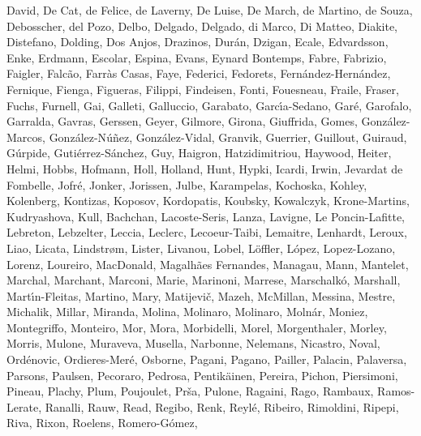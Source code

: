 \documentclass{aa}
\begin{document}
\begin{thebibliography}{242}
{  {David}, {De Cat}, {de Felice}, {de Laverny}, {De Luise}, {De March}, {de
  Martino}, {de Souza}, {Debosscher}, {del Pozo}, {Delbo}, {Delgado},
  {Delgado}, {di Marco}, {Di Matteo}, {Diakite}, {Distefano}, {Dolding}, {Dos
  Anjos}, {Drazinos}, {Dur{\'a}n}, {Dzigan}, {Ecale}, {Edvardsson}, {Enke},
  {Erdmann}, {Escolar}, {Espina}, {Evans}, {Eynard Bontemps}, {Fabre},
  {Fabrizio}, {Faigler}, {Falc{\~a}o}, {Farr{\`a}s Casas}, {Faye}, {Federici},
  {Fedorets}, {Fern{\'a}ndez-Hern{\'a}ndez}, {Fernique}, {Fienga}, {Figueras},
  {Filippi}, {Findeisen}, {Fonti}, {Fouesneau}, {Fraile}, {Fraser}, {Fuchs},
  {Furnell}, {Gai}, {Galleti}, {Galluccio}, {Garabato}, {Garc{\'{\i}}a-Sedano},
  {Gar{\'e}}, {Garofalo}, {Garralda}, {Gavras}, {Gerssen}, {Geyer}, {Gilmore},
  {Girona}, {Giuffrida}, {Gomes}, {Gonz{\'a}lez-Marcos},
  {Gonz{\'a}lez-N{\'u}{\~n}ez}, {Gonz{\'a}lez-Vidal}, {Granvik}, {Guerrier},
  {Guillout}, {Guiraud}, {G{\'u}rpide}, {Guti{\'e}rrez-S{\'a}nchez}, {Guy},
  {Haigron}, {Hatzidimitriou}, {Haywood}, {Heiter}, {Helmi}, {Hobbs},
  {Hofmann}, {Holl}, {Holland}, {Hunt}, {Hypki}, {Icardi}, {Irwin}, {Jevardat
  de Fombelle}, {Jofr{\'e}}, {Jonker}, {Jorissen}, {Julbe}, {Karampelas},
  {Kochoska}, {Kohley}, {Kolenberg}, {Kontizas}, {Koposov}, {Kordopatis},
  {Koubsky}, {Kowalczyk}, {Krone-Martins}, {Kudryashova}, {Kull}, {Bachchan},
  {Lacoste-Seris}, {Lanza}, {Lavigne}, {Le Poncin-Lafitte}, {Lebreton},
  {Lebzelter}, {Leccia}, {Leclerc}, {Lecoeur-Taibi}, {Lemaitre}, {Lenhardt},
  {Leroux}, {Liao}, {Licata}, {Lindstr{\o}m}, {Lister}, {Livanou}, {Lobel},
  {L{\"o}ffler}, {L{\'o}pez}, {Lopez-Lozano}, {Lorenz}, {Loureiro},
  {MacDonald}, {Magalh{\~a}es Fernandes}, {Managau}, {Mann}, {Mantelet},
  {Marchal}, {Marchant}, {Marconi}, {Marie}, {Marinoni}, {Marrese},
  {Marschalk{\'o}}, {Marshall}, {Mart{\'{\i}}n-Fleitas}, {Martino}, {Mary},
  {Matijevi{\v c}}, {Mazeh}, {McMillan}, {Messina}, {Mestre}, {Michalik},
  {Millar}, {Miranda}, {Molina}, {Molinaro}, {Molinaro}, {Moln{\'a}r},
  {Moniez}, {Montegriffo}, {Monteiro}, {Mor}, {Mora}, {Morbidelli}, {Morel},
  {Morgenthaler}, {Morley}, {Morris}, {Mulone}, {Muraveva}, {Musella},
  {Narbonne}, {Nelemans}, {Nicastro}, {Noval}, {Ord{\'e}novic},
  {Ordieres-Mer{\'e}}, {Osborne}, {Pagani}, {Pagano}, {Pailler}, {Palacin},
  {Palaversa}, {Parsons}, {Paulsen}, {Pecoraro}, {Pedrosa}, {Pentik{\"a}inen},
  {Pereira}, {Pichon}, {Piersimoni}, {Pineau}, {Plachy}, {Plum}, {Poujoulet},
  {Pr{\v s}a}, {Pulone}, {Ragaini}, {Rago}, {Rambaux}, {Ramos-Lerate},
  {Ranalli}, {Rauw}, {Read}, {Regibo}, {Renk}, {Reyl{\'e}}, {Ribeiro},
  {Rimoldini}, {Ripepi}, {Riva}, {Rixon}, {Roelens}, {Romero-G{\'o}mez},
}
\end{thebibliography}
\end{document}
